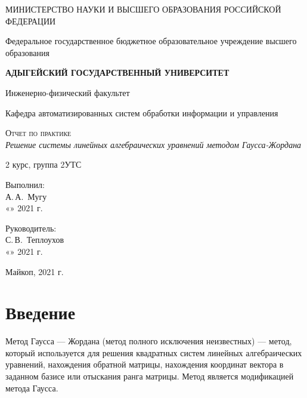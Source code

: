\documentclass[12pt,a4paper]{scrartcl}
\begin{document}
		\begin{titlepage}
		\begin{center}
			\large
			МИНИСТЕРСТВО НАУКИ И ВЫСШЕГО ОБРАЗОВАНИЯ РОССИЙСКОЙ ФЕДЕРАЦИИ
			
			Федеральное государственное бюджетное образовательное учреждение высшего образования
			
			\textbf{АДЫГЕЙСКИЙ ГОСУДАРСТВЕННЫЙ УНИВЕРСИТЕТ}
			\vspace{0.25cm}
			
			Инженерно-физический факультет
			
			Кафедра автоматизированных систем обработки информации и управления
			\vfill
			
			\vfill
			
			\textsc{Отчет по практике}\\[5mm]
			
			{\LARGE \textit{Решение системы линейных алгебраических уравнений методом Гаусса-Жордана}}
			\bigskip
			
			2 курс, группа 2УТС
		\end{center}
		\vfill
		
		\newlength{\ML}
		\hfill\begin{minipage}{0.5\textwidth}
			Выполнил:\\
			\underline{\hspace{\ML}} А.\,А.~Мугу\\
			«\underline{\hspace{0.7cm}}» \underline{\hspace{2cm}} 2021 г.
		\end{minipage}%
		\bigskip
		
		\hfill\begin{minipage}{0.5\textwidth}
			Руководитель:\\
			\underline{\hspace{\ML}} С.\,В.~Теплоухов\\
			«\underline{\hspace{0.7cm}}» \underline{\hspace{2cm}} 2021 г.
		\end{minipage}%
		\vfill
		
		\begin{center}
			Майкоп, 2021 г.
		\end{center}
	\end{titlepage}
\section{Введение}
\label{sec:intro}
Метод Гаусса — Жордана (метод полного исключения неизвестных) — метод, который используется для решения квадратных систем линейных алгебраических уравнений, нахождения обратной матрицы, нахождения координат вектора в заданном базисе или отыскания ранга матрицы. Метод является модификацией метода Гаусса. 
\end{document}
